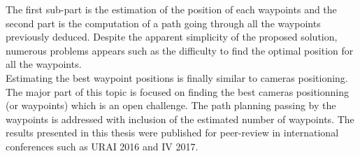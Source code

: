 
The first sub-part is the estimation of the position of each waypoints and the second part is the computation of a path going through all the waypoints previously deduced. Despite the apparent simplicity of the proposed solution, numerous problems appears such as the difficulty to find the optimal position for all the waypoints. \\
Estimating the best waypoint positions is finally similar to cameras positioning. The major part of this topic is focused on finding the best cameras positionning (or waypoints) which is an open challenge. The path planning passing by the waypoints is addressed with inclusion of the estimated number of waypoints.
The results presented in this thesis were published for peer-review in international conferences such as  URAI 2016  and IV 2017. 







